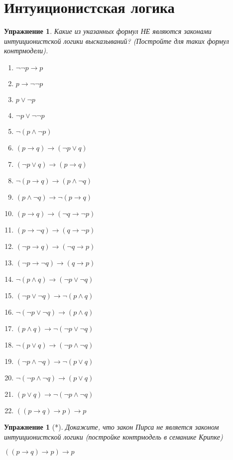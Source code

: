 \documentclass[11pt]{article}
\newtheorem{exercise}[theorem]{Упражнение}
\begin{document}
\section{Интуиционистская логика}
\begin{exercise} Какие из указанных формул НЕ являются законами интуиционистской логики высказываний? (Постройте для таких формул контрмодели).
\begin{multicols}{2}
\begin{enumerate}
	\item $\neg \neg p \to p$
	\item $p \to \neg \neg p$
	\item $p \vee \neg p$
	\item $\neg p \vee \neg \neg p$
	\item $\neg (p \wedge \neg p)$
	\item $(p \to q) \to (\neg p \vee q)$
	\item $(\neg p \vee q) \to (p \to q)$
	\item $\neg (p \to q) \to (p \wedge \neg q)$
	\item $(p \wedge \neg q) \to \neg (p \to q) $
	\item $(p \to q) \to (\neg q \to \neg p)$
	\item $(p \to \neg q) \to (q \to \neg p)$
	\item $(\neg p \to q) \to (\neg q \to p)$
	\item $(\neg p \to \neg q) \to (q \to p)$
	\item $\neg (p \wedge q) \to (\neg p \vee \neg q)$
    \item $(\neg p \vee \neg q) \to \neg (p \wedge q)$
    \item $\neg (\neg p \vee \neg q) \to (p \wedge q)$
    \item $(p \wedge q) \to \neg (\neg p \vee \neg q)$
  	\item $\neg (p \vee q) \to (\neg p \wedge \neg q)$
  	\item $(\neg p \wedge \neg q) \to \neg (p \vee q)$
    \item $\neg  (\neg p \wedge  \neg q) \to (p \vee q)$
    \item $(p \vee q) \to \neg  (\neg p \wedge  \neg q)$
    \item $((p \to q) \to p) \to p $
\end{enumerate}
\end{multicols}
\end{exercise}


\begin{exercise}[*] Докажите, что закон Пирса не является законом интуиционистской логики (постройке контрмодель в семанике Крипке)
\begin{center}
    $((p\to q) \to p) \to p $
\end{center}
\end{exercise}
\end{document}
